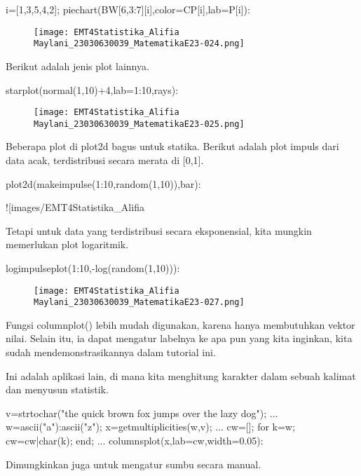 \documentclass{article}
\begin{document}
\>i=[1,3,5,4,2]; piechart(BW[6,3:7][i],color=CP[i],lab=P[i]):


\begin{figure}
    \centering
    \texttt{[image: EMT4Statistika\_Alifia Maylani\_23030630039\_MatematikaE23-024.png]}
    \caption{}
    \label{fig:enter-label}
\end{figure}

Berikut adalah jenis plot lainnya.


\>starplot(normal(1,10)+4,lab=1:10,\>rays):


\begin{figure}
    \centering
    \texttt{[image: EMT4Statistika\_Alifia Maylani\_23030630039\_MatematikaE23-025.png]}
    \caption{}
    \label{fig:enter-label}
\end{figure}

Beberapa plot di plot2d bagus untuk statika. Berikut adalah plot
impuls dari data acak, terdistribusi secara merata di [0,1].


\>plot2d(makeimpulse(1:10,random(1,10)),\>bar):


![images/EMT4Statistika_Alifia%

Tetapi untuk data yang terdistribusi secara eksponensial, kita mungkin
memerlukan plot logaritmik.


\>logimpulseplot(1:10,-log(random(1,10))):


\begin{figure}
    \centering
    \texttt{[image: EMT4Statistika\_Alifia Maylani\_23030630039\_MatematikaE23-027.png]}
    \caption{}
    \label{fig:enter-label}
\end{figure}

Fungsi columnplot() lebih mudah digunakan, karena hanya membutuhkan
vektor nilai. Selain itu, ia dapat mengatur labelnya ke apa pun yang
kita inginkan, kita sudah mendemonstrasikannya dalam tutorial ini.


Ini adalah aplikasi lain, di mana kita menghitung karakter dalam
sebuah kalimat dan menyusun statistik.


\>v=strtochar("the quick brown fox jumps over the lazy dog"); ...  
\>   w=ascii("a"):ascii("z"); x=getmultiplicities(w,v); ...  
\>   cw=[]; for k=w; cw=cw|char(k); end; ...  
\>   columnsplot(x,lab=cw,width=0.05):




Dimungkinkan juga untuk mengatur sumbu secara manual.
\end{document}
